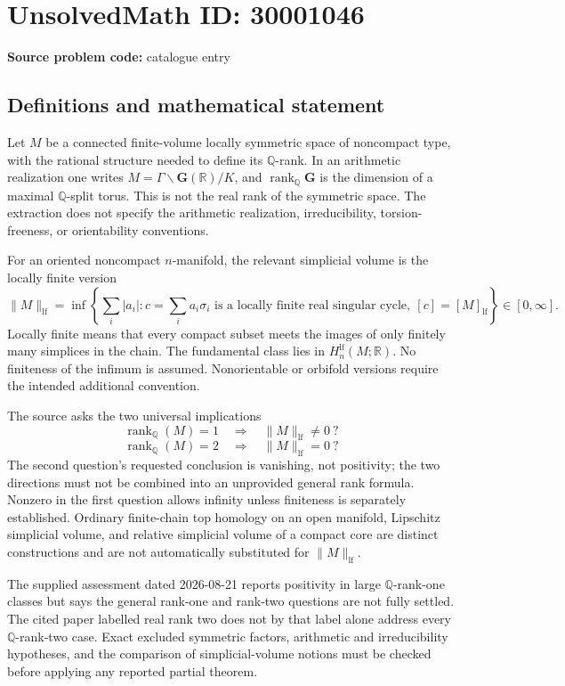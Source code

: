 \documentclass[11pt]{article}
\newcommand{\Q}{\mathbb{Q}}
\newcommand{\R}{\mathbb{R}}
\begin{document}
\section*{UnsolvedMath ID: 30001046}
\textbf{Source problem code:} catalogue entry
\subsection{Definitions and mathematical statement}
Let \(M\) be a connected finite-volume locally symmetric space of noncompact type, with the rational structure needed to define its \(\Q\)-rank. In an arithmetic realization one writes \(M=\Gamma\backslash\mathbf G(\R)/K\), and \(\operatorname{rank}_{\Q}\mathbf G\) is the dimension of a maximal \(\Q\)-split torus. This is not the real rank of the symmetric space. The extraction does not specify the arithmetic realization, irreducibility, torsion-freeness, or orientability conventions.

For an oriented noncompact \(n\)-manifold, the relevant simplicial volume is the locally finite version
\[
 \|M\|_{\mathrm{lf}}=
 \inf\left\{\sum_i|a_i|:
 c=\sum_i a_i\sigma_i\text{ is a locally finite real singular cycle},
 \ [c]=[M]_{\mathrm{lf}}\right\}\in[0,\infty].
\]
Locally finite means that every compact subset meets the images of only finitely many simplices in the chain. The fundamental class lies in \(H_n^{\mathrm{lf}}(M;\R)\). No finiteness of the infimum is assumed. Nonorientable or orbifold versions require the intended additional convention.

The source asks the two universal implications
\[
 \operatorname{rank}_{\Q}(M)=1\quad\Longrightarrow\quad
 \|M\|_{\mathrm{lf}}\ne0\ ?
\]
\[
 \operatorname{rank}_{\Q}(M)=2\quad\Longrightarrow\quad
 \|M\|_{\mathrm{lf}}=0\ ?
\]
The second question's requested conclusion is vanishing, not positivity; the two directions must not be combined into an unprovided general rank formula. Nonzero in the first question allows infinity unless finiteness is separately established. Ordinary finite-chain top homology on an open manifold, Lipschitz simplicial volume, and relative simplicial volume of a compact core are distinct constructions and are not automatically substituted for \(\|M\|_{\mathrm{lf}}\).

The supplied assessment dated 2026-08-21 reports positivity in large \(\Q\)-rank-one classes but says the general rank-one and rank-two questions are not fully settled. The cited paper labelled real rank two does not by that label alone address every \(\Q\)-rank-two case. Exact excluded symmetric factors, arithmetic and irreducibility hypotheses, and the comparison of simplicial-volume notions must be checked before applying any reported partial theorem.
\end{document}
